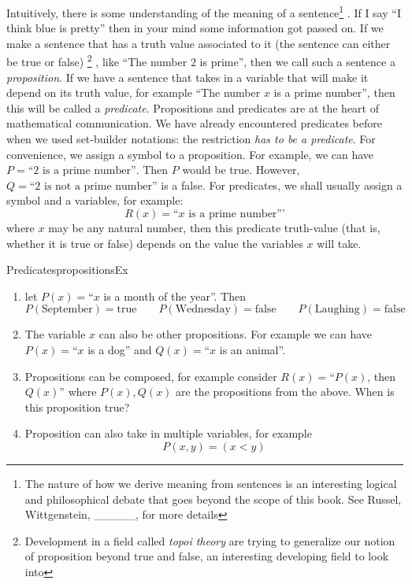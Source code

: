 \documentclass{book}
\newcommand{\placeholder}{\_\_\_\_\_}
\begin{document}
Intuitively, there is some understanding of the meaning of a sentence\footnote{The nature of how we derive
meaning from sentences is an interesting logical and philosophical debate that goes beyond the scope of
this book. See Russel, Wittgenstein, \placeholder, for more details} . If I say ``I think blue is pretty''
then in your mind some information got passed on. If we make a sentence that has a truth value associated
to it (the sentence can either be true or false) \footnote{Development in a field called \emph{topoi
theory} are trying to generalize our notion of proposition beyond true and false, an interesting
developing field to look into} , like ``The number $2$ is prime'', then  we call such a sentence a
\emph{proposition}. If we have a sentence that takes in a variable that will make it depend on its truth
value, for example ``The number $x$ is a prime number'', then this will be called a \emph{predicate}.
Propositions and predicates are at the heart of mathematical communication. We have already encountered
predicates before when we used set-builder notations: the restriction \emph{has to be a predicate}. For
convenience, we assign a symbol to a proposition. For example, we can have $P = \text{``2 is a prime
number''}$. Then $P$ would be true. However, $Q = \text{``2 is not a prime number''}$ is a false. For
predicates, we shall usually assign a symbol and a variables, for example:
\[
	R(x) = \text{``$x$ is a prime number'''}
\]
where $x$ may be any natural number, then this predicate truth-value (that is, whether it is true or false) depends on the value the variables $x$ will take.



\begin{example}{Predicates}{propositionsEx}
	\begin{enumerate}
		\item let $P(x) =  $``$x$ is a month of the year''. Then
			\[
				P(\text{September}) = \text{true} \qquad P(\text{Wednesday}) = \text{false} \qquad P(\text{Laughing})
				= \text{false}
			\]
		\item The variable $x$ can also be other propositions. For example we can have $P(x) = $``$x$ is a dog'' and
			$Q(x) =$``$x$ is an animal''.
		\item  Propositions can be composed, for example consider $R(x) =$``$P(x)$, then $Q(x)$'' where $P(x),
			Q(x)$ are the propositions from the above. When is this proposition true?
		\item Proposition can also take in multiple variables, for example
			\[
				P(x,y) = (x < y)
			\]
	\end{enumerate}
\end{example}
\end{document}
